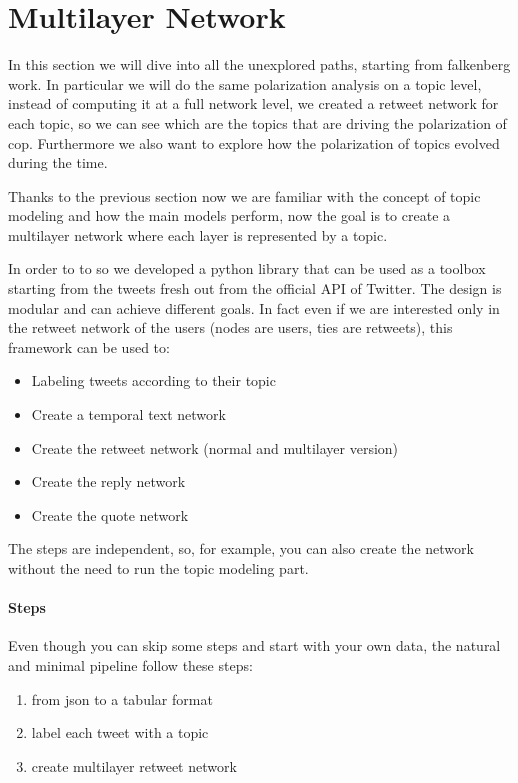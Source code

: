 
\section{Multilayer Network}

In this section we will dive into all the unexplored paths, starting from falkenberg work. In particular we will do the same polarization analysis on a topic level, instead of computing it at a full network level, we created  a retweet network for each topic, so we can see which are the topics that are driving the polarization of cop. Furthermore we also want to explore how the polarization of topics evolved during the time.

Thanks to the previous section now we are familiar with the concept of topic modeling and how the main models perform, now the goal is to create a multilayer network where each layer is represented by a topic. 

In order to to so we developed a python library  that can be used as a toolbox starting from the tweets fresh out from the official API of Twitter. The design is modular and can achieve different goals.
In fact even if we are interested only in the retweet network of the users (nodes are users, ties are retweets), this framework can be used to: 

\begin{itemize}
    \item Labeling tweets according to their topic
    \item Create a temporal text network 
    \item Create the retweet network (normal and multilayer version)
    \item Create the reply network
    \item Create the quote network

\end{itemize}

The steps are independent, so, for example, you can also create the network without the need to run the topic modeling part.

\paragraph{Steps}
Even though you can skip some steps and start with your own data, the natural and minimal pipeline follow these steps:


\begin{enumerate}
    \item from json to a tabular format 
    \item label each tweet with a topic
    \item create multilayer retweet network  
    
\end{enumerate} 


